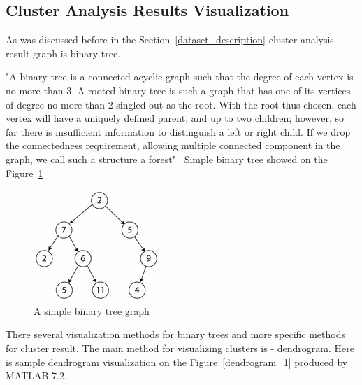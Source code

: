 \documentclass[a4paper,oneside]{article}
\begin{document}
\subsection{Cluster Analysis Results Visualization}

As was discussed before in the Section~\ref{dataset_description} cluster analysis result graph is binary tree.

"A binary tree is a connected acyclic graph such that the degree of each vertex is no more than 3. A rooted binary tree is such a graph that has one of its vertices of degree no more than 2 singled out as the root. With the root thus chosen, each vertex will have a uniquely defined parent, and up to two children; however, so far there is insufficient information to distinguish a left or right child. If we drop the connectedness requirement, allowing multiple connected component in the graph, we call such a structure a forest"~\cite{BINARY_TREE} Simple binary tree showed on the Figure~\ref{simple_binary_tree}

\begin{figure}
\begin{center}
	\includegraphics[scale=1.0]{pictures/simple_binary_tree.png}
	\caption{A simple binary tree graph}
	\label{simple_binary_tree}
\end{center}
\end{figure}


There several visualization methods for binary trees and more specific methods for cluster result. The main method for visualizing clusters is - dendrogram. Here is sample dendrogram visualization on the Figure~\ref{dendrogram_1} produced by MATLAB 7.2.
\end{document}
